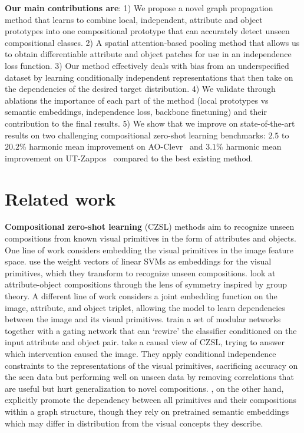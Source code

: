 \documentclass{article}
\begin{document}
\textbf{Our main contributions are}: 1) We propose a novel graph propagation method that learns to combine local, independent, attribute and object prototypes into one compositional prototype that can accurately detect unseen compositional classes. 2) A spatial attention-based pooling method that allows us to obtain differentiable attribute and object patches for use in an independence loss function. 3) Our method effectively deals with bias from an underspecified dataset by learning conditionally independent representations that then take on the dependencies of the desired target distribution. 4) We validate through ablations the importance of each part of the method (local prototypes vs semantic embeddings, independence loss, backbone finetuning) and their contribution to the final results. 5) We show that we improve on state-of-the-art results on two challenging compositional zero-shot learning benchmarks: $2.5$ to $20.2$\% harmonic mean improvement on AO-Clevr~\citep{atzmon2020causal} and $3.1\%$ harmonic mean improvement on UT-Zappos~\citep{yu2014fine} compared to the best existing method.

\section{Related work}
\textbf{Compositional zero-shot learning} (CZSL) methods aim to recognize unseen compositions from known visual primitives in the form of attributes and objects. One line of work considers embedding the visual primitives in the image feature space. \citet{misra2017red} use the weight vectors of linear SVMs as embeddings for the visual primitives, which they transform to recognize unseen compositions. \citet{li2020symmetry} look at attribute-object compositions through the lens of symmetry inspired by group theory. A different line of work considers a joint embedding function on the image, attribute, and object triplet, allowing the model to learn dependencies between the image and its visual primitives. \citet{purushwalkam2019task} train a set of modular networks together with a gating network that can `rewire' the classifier conditioned on the input attribute and object pair. \citet{atzmon2020causal} take a causal view of CZSL, trying to answer which intervention caused the image. They apply conditional independence constraints to the representations of the visual primitives, sacrificing accuracy on the seen data but performing well on unseen data by removing correlations that are useful but hurt generalization to novel compositions. \citet{naeem2021learning}, on the other hand, explicitly promote the dependency between all primitives and their compositions within a graph structure, though they rely on pretrained semantic embeddings which may differ in distribution from the visual concepts they describe.
\end{document}
